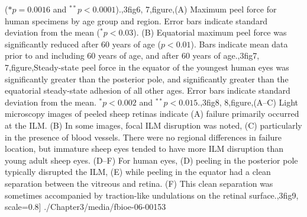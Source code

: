 \documentclass[../../Dissertation]{subfiles}
\begin{document}
{{        ($*p = 0.0016$ and $^{**}p < 0.0001$).},3fig6,   
    7,figure,{(A) Maximum peel force for human specimens by age group and
        region. Error bars indicate standard deviation from the mean ($^*p <
        0.03$).  (B) Equatorial maximum peel force was significantly reduced
        after 60 years of age ($p < 0.01$). Bars indicate mean data prior to
        and including 60 years of age, and after 60 years of age.},3fig7,   
    7,figure,{Steady-state peel force in the equator of the youngest human
        eyes was significantly greater than the posterior pole, and
        significantly greater than the equatorial steady-state adhesion of all
        other ages. Error bars indicate standard deviation from the mean. $^*p
        < 0.002$ and $^{**}p < 0.015$.},3fig8,   
    8,figure,{(A–C) Light microscopy images of peeled sheep retinas indicate
        (A) failure primarily occurred at the ILM. (B) In some images, focal
        ILM disruption was noted, (C) particularly in the presence of blood
        vessels. There were no regional differences in failure location, but
        immature sheep eyes tended to have more ILM disruption than young adult
        sheep eyes. (D–F) For human eyes, (D) peeling in the posterior pole
        typically disrupted the ILM, (E) while peeling in the equator had a
        clean separation between the vitreous and retina.  (F) This clean
        separation was sometimes accompanied by traction-like undulations on
        the retinal surface.},3fig9},
scale=0.8]
{./Chapter3/media/fbioe-06-00153}
\end{document}
